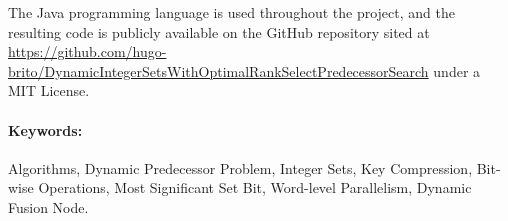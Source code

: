 The Java programming language is used throughout the project, and the resulting code is publicly available on the GitHub repository sited at \url{https://github.com/hugo-brito/DynamicIntegerSetsWithOptimalRankSelectPredecessorSearch} under a MIT License.

\paragraph*{Keywords:} Algorithms, Dynamic Predecessor Problem, Integer Sets, Key Compression, Bit-wise Operations, Most Significant Set Bit, Word-level Parallelism, Dynamic Fusion Node.

    
    
    


